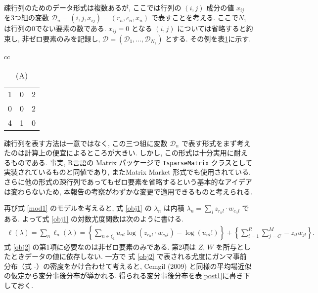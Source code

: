 \documentclass[a4paper,12pt]{jsarticle} %
\numberwithin{equation}{section} %
\begin{document}
疎行列のためのデータ形式は複数あるが, ここでは行列の $(i,j)$ 成分の値 $x_{ij}$ を3つ組の変数 $ \mathcal{D}_n  = (i,j,x_{ij})=(r_n, c_n, x_n)$ で表すことを考える. ここで$N_1$ は行列の0でない要素の数である.  $x_{ij}=0$ となる $(i,j)$ については省略すると約束し, 非ゼロ要素のみを記録し, $\mathcal{D}=(\mathcal{D}_1, \ldots, \mathcal{D}_{N_1})$ とする. その例を表\ref{tab1}に示す. 
\begin{table}[tbp]
\centering
\caption{疎行列の例. (A)と(B)は同じ情報を持つ. (B)は本研究で扱う疎行列の形式である. }\label{tab1}
\begin{tabular}{cc}
\begin{subtable}{0.2\linewidth}\centering
{
\caption*{(A)}
\begin{tabular}{|ccc|}
\hline
1 & 0 & 2\\
0 & 0 & 2\\
4 & 1 & 0\\
\hline
\end{tabular}
}
\end{subtable}
\begin{subtable}{0.2\linewidth}
\end{subtable}
\end{tabular}
\end{table}
疎行列を表す方法は一意ではなく, この三つ組に変数 $\mathcal{D}_n$ で表す形式をまず考えたのは計算上の便宜によるところが大きい. しかし, この形式は十分実用に耐えるものである. 事実, R言語の Matrix パッケージで \verb|TsparseMatrix| クラスとして実装されているものと同値であり, またMatrix Market 形式でも使用されている.  %
さらに他の形式の疎行列であってもゼロ要素を省略するという基本的なアイデアは変わらないため, 本報告の考察がわずかな変更で適用できるものと考えられる.

再び式 \eqref{mod1} のモデルを考えると, 式 \eqref{obj1} の $\lambda_n$ は内積 $\lambda_n = \sum_l  z_{r_nl} \cdot w_{c_nl}$ である.
よって式 \eqref{obj1} の対数尤度関数は次のように書ける. 
\begin{align}
\ell (\lambda) = \sum_n \ell_n (\lambda) = \left\{ \sum_{n \in \xi_1} u_{nl} \log(z_{r_nl} \cdot w_{c_nl})  - \log(u_{nl}!) \right\} + \left\{  \sum_{i=1}^{R}\sum_{j=C}^M  -  z_{il}  w_{jl}\right\}. \label{obj2}
\end{align}
式 \eqref{obj2} の第1項に必要なのは非ゼロ要素のみである. 第2項は $Z$, $W$ を所与としたときデータの値に依存しない. 一方で 式 \eqref{obj2} で表される尤度にガンマ事前分布（式 -）の密度をかけ合わせて考えると,  Cemgil (2009) と同様の平均場近似の仮定から変分事後分布が導かれる. 得られる変分事後分布を表\ref{post1}に書き下しておく.
\end{document}
